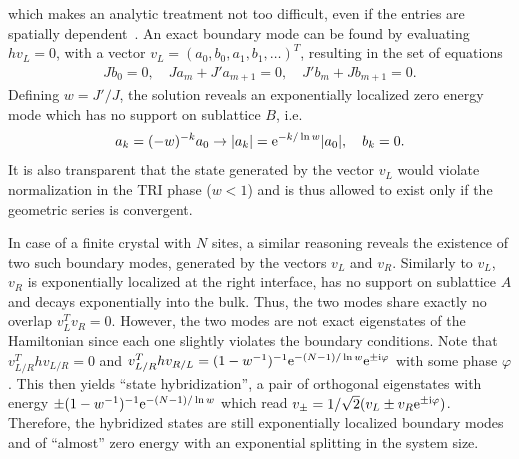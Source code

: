 which makes an analytic treatment not too difficult, even if the entries are spatially dependent~\cite{Asboth2016}.
An exact boundary mode can be found by evaluating $hv_L=0$, with a vector $v_L = (a_0,b_0,a_1,b_1,\dots)^T$, resulting in the set of equations
\begin{align}
    J b_0 = 0,
    \quad
    Ja_m + J' a_{m+1} = 0,
    \quad
    J' b_m + J b_{m+1} = 0.
\end{align}
Defining $w=J'/J$, the solution reveals an exponentially localized zero energy mode which has no support on sublattice $B$, i.e.
\begin{align}
    a_k=(-w)^{-k} a_0 \rightarrow |a_k| = \mathrm e^{-k/\ln w}|a_0|,
    \quad
    b_k = 0.
    \label{eq:boundary_mode}
\end{align}
It is also transparent that the state generated by the vector $v_L$ would violate normalization in the TRI phase ($w<1$) and is thus allowed to exist only if the geometric series is convergent.

In case of a finite crystal with $N$ sites, a similar reasoning reveals the existence of two such boundary modes, generated by the vectors $v_L$ and $v_R$.
Similarly to $v_L$, $v_R$ is exponentially localized at the right interface, has no support on sublattice $A$ and decays exponentially into the bulk.
Thus, the two modes share exactly no overlap $v_L^T v_R = 0$.
However, the two modes are not exact eigenstates of the Hamiltonian since each one slightly violates the boundary conditions.
Note that $v_{L/R}^T h v_{L/R} = 0$ and $v_{L/R}^T h v_{R/L} = (1-w^{-1})^{-1}\mathrm e^{-(N-1)/\ln w}\mathrm e^{\pm\mathrm i\varphi}$ with some phase $\varphi$.
This then yields ``state hybridization'', a pair of orthogonal eigenstates with energy $\pm(1-w^{-1})^{-1}\mathrm e^{-(N-1)/\ln w}$ which read $v_\pm = 1/\sqrt2(v_L \pm v_R\mathrm e^{\pm\mathrm i\varphi})$.
Therefore, the hybridized states are still exponentially localized boundary modes and of ``almost'' zero energy with an exponential splitting in the system size.
%
%
